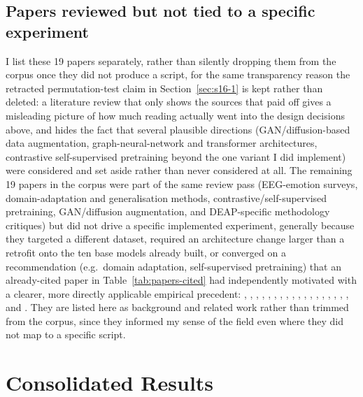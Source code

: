 \documentclass[11pt]{report}
\begin{document}
\section{Papers reviewed but not tied to a specific experiment}
\label{sec:literature-gap}
I list these 19 papers separately, rather than silently dropping them from
the corpus once they did not produce a script, for the same transparency
reason the retracted permutation-test claim in Section~\ref{sec:s16-1} is
kept rather than deleted: a literature review that only shows the sources
that paid off gives a misleading picture of how much reading actually went
into the design decisions above, and hides the fact that several plausible
directions (GAN/diffusion-based data augmentation, graph-neural-network and
transformer architectures, contrastive self-supervised pretraining beyond
the one variant I did implement) were considered and set aside rather than
never considered at all. The remaining 19 papers in the corpus were part of
the same review pass (EEG-emotion surveys, domain-adaptation and
generalisation methods, contrastive/self-supervised pretraining,
GAN/diffusion augmentation, and DEAP-specific methodology critiques) but did
not drive a specific implemented experiment, generally because they targeted
a different dataset, required an architecture change larger than a
retrofit onto the ten base models already built, or converged on a
recommendation (e.g.\ domain adaptation, self-supervised pretraining) that
an already-cited paper in Table~\ref{tab:papers-cited} had independently
motivated with a clearer, more directly applicable empirical precedent:
\citet{liu2022spatiotemporal}, \citet{qiao2022cnn3d},
\citet{menezes2017virtual}, \citet{xu2022amdet}, \citet{guo2023memhacl},
\citet{kan2022sgmc}, \citet{siddhad2025diffusion},
\citet{liu2024graphperspective}, \citet{liu2025scmm}, \citet{wang2025fourier},
\citet{gong2025lel}, \citet{dolgopolyi_ndeeplearning},
\citet{purwar2026threeway}, \citet{kalashami2022augmentation},
\citet{pan2021gan}, \citet{liu2024ertnet}, \citet{hamzah2024heliyon},
\citet{azar2024fuzzy}, and \citet{karthiga2024metaheuristic}. They are
listed here as background and related work rather than trimmed from the
corpus, since they informed my sense of the field even where they did not
map to a specific script.

\chapter{Consolidated Results}
\label{ch:results}
\end{document}
